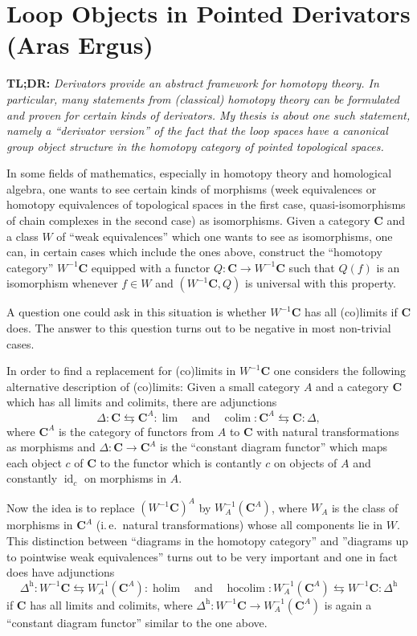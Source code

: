 \section{Loop Objects in Pointed Derivators (Aras Ergus)}

\textbf{TL;DR:} \emph{Derivators provide an abstract framework for homotopy
theory. In particular, many statements from (classical) homotopy theory
can be formulated and proven for certain kinds of derivators. My thesis
is about one such statement, namely a ``derivator version'' of the fact that
the loop spaces have a canonical group object structure in the homotopy
category of pointed topological spaces.}

In some fields of mathematics, especially in homotopy theory and
homological algebra, one wants to see certain kinds of morphisms
(week equivalences or homotopy equivalences of topological spaces
in the first case, quasi-isomorphisms of chain complexes in the second
case) as isomorphisms. Given a category $\mathbf{C}$ and a class $W$
of ``weak equivalences'' which one wants to see as isomorphisms,
one can, in certain cases which include the ones above, construct the
``homotopy category'' $W^{-1}\mathbf{C}$ equipped with a functor
$Q \colon \mathbf{C} \to W^{-1}\mathbf{C}$ such that $Q(f)$ is
an isomorphism whenever $f \in W$ and $(W^{-1}\mathbf{C}, Q)$ is
universal with this property.

A question one could ask in this situation is whether $W^{-1}\mathbf{C}$
has all (co)limits if $\mathbf{C}$ does. The answer to this
question turns out to be negative in most non-trivial cases.

In order to find a replacement for (co)limits in $W^{-1}\mathbf{C}$
one considers the following alternative description of (co)limits:
Given a small category $A$ and a category $\mathbf{C}$ which has all limits
and colimits, there are adjunctions
\[
\Delta \colon \mathbf{C} \leftrightarrows \mathbf{C}^A \colon \lim
\quad \text{and} \quad
\operatorname{colim} \colon \mathbf{C}^A \leftrightarrows
\mathbf{C} \colon \Delta,
\]
where $\mathbf{C}^A$ is the category of functors from $A$ to $\mathbf{C}$
with natural transformations as morphisms and
$\Delta \colon \mathbf{C} \to \mathbf{C}^A$ is the ``constant diagram
functor'' which maps each object $c$ of $\mathbf{C}$ to the functor which is
contantly $c$ on objects of $A$ and constantly $\operatorname{id}_c$ on
morphisms in $A$.

Now the idea is to replace $(W^{-1}\mathbf{C})^A$ by
$W_A^{-1}(\mathbf{C}^A)$, where $W_A$ is the class of morphisms in
$\mathbf{C}^A$ (i.\,e.\ natural transformations) whose all components lie in
$W$. This distinction between ``diagrams in the homotopy category'' and
''diagrams up to pointwise weak equivalences'' turns out to be very important
and one in fact does have adjunctions
\[
\Delta^{\mathrm{h}} \colon W^{-1}\mathbf{C} \leftrightarrows
W_A^{-1}(\mathbf{C}^A) \colon \operatorname{holim}
\quad \text{and} \quad
\operatorname{hocolim} \colon W_A^{-1}(\mathbf{C}^A) \leftrightarrows
W^{-1}\mathbf{C} \colon \Delta^{\mathrm{h}}
\]
if $\mathbf{C}$ has all limits and colimits, where
$\Delta^{\mathrm{h}} \colon W^{-1}\mathbf{C} \to W_A^{-1}(\mathbf{C}^A)$ is
again a ``constant diagram functor'' similar to the one above.

